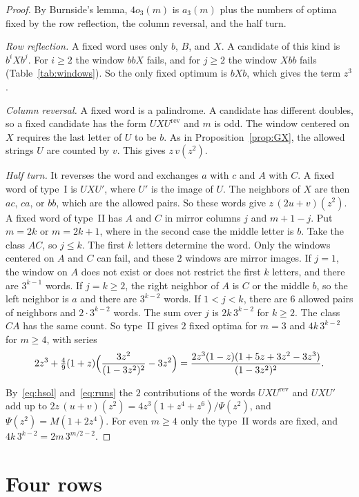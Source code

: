 \documentclass[12pt]{article}
\theoremstyle{plain}
\theoremstyle{definition}
\theoremstyle{remark}
\begin{document}
\begin{proof}
By Burnside's lemma, $4o_3(m)$ is $a_3(m)$ plus the numbers of optima fixed by
the row reflection, the column reversal, and the half turn.

\emph{Row reflection.} A fixed word uses only $b$, $B$, and $X$. A candidate of
this kind is $b^iXb^j$. For $i\ge2$ the window $bbX$ fails, and for $j\ge2$ the
window $Xbb$ fails (Table~\ref{tab:windows}). So the only fixed optimum is
$bXb$, which gives the term $z^3$.

\emph{Column reversal.} A fixed word is a palindrome. A candidate has
different doubles, so a fixed candidate has the form $UXU^{\mathrm{rev}}$ and
$m$ is odd. The window centered on $X$ requires the last letter of $U$ to be
$b$. As in Proposition~\ref{prop:GX}, the allowed strings $U$ are counted by
$v$. This gives $z\,v(z^2)$.

\emph{Half turn.} It reverses the word and exchanges $a$ with $c$ and $A$ with
$C$. A fixed word of type~I is $UXU'$, where $U'$ is the image of $U$. The
neighbors of $X$ are then $ac$, $ca$, or $bb$, which are the allowed pairs. So
these words give $z\,(2u+v)(z^2)$. A fixed word of type~II has $A$ and $C$ in
mirror columns $j$ and $m+1-j$. Put $m=2k$ or $m=2k+1$, where in the second
case the middle letter is $b$. Take the class $AC$, so $j\le k$. The first $k$
letters determine the word. Only the windows centered on $A$ and $C$ can fail,
and these $2$ windows are mirror images. If $j=1$, the window on $A$ does not
exist or does not restrict the first $k$ letters, and there are $3^{k-1}$
words. If $j=k\ge2$, the right neighbor of $A$ is $C$ or the middle $b$, so the
left neighbor is $a$ and there are $3^{k-2}$ words. If $1<j<k$, there are
$6$ allowed pairs of neighbors and $2\cdot3^{k-2}$ words. The sum over $j$ is
$2k\,3^{k-2}$ for $k\ge2$. The class $CA$ has the same count. So type~II
gives $2$ fixed optima for $m=3$ and $4k\,3^{k-2}$ for $m\ge4$, with series
\[
2z^3+\tfrac49(1+z)\Bigl(\frac{3z^2}{(1-3z^2)^2}-3z^2\Bigr)
=\frac{2z^3(1-z)(1+5z+3z^2-3z^3)}{(1-3z^2)^2}.
\]

By~\eqref{eq:hsol} and~\eqref{eq:runs} the $2$ contributions of the words
$UXU^{\mathrm{rev}}$ and $UXU'$ add up to
$2z\,(u+v)(z^2)=4z^3(1+z^4+z^6)/\Psi(z^2)$, and $\Psi(z^2)=M(1+2z^4)$. For even
$m\ge4$ only the type~II words are fixed, and $4k\,3^{k-2}=2m\,3^{m/2-2}$.
\end{proof}
\section{Four rows}\label{sec:four}
\end{document}
